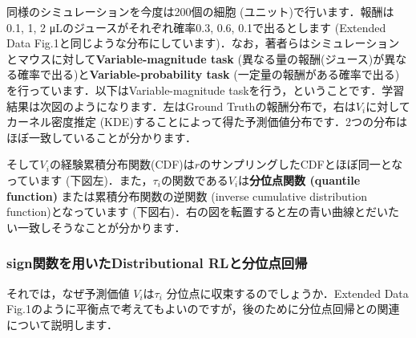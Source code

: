 同様のシミュレーションを今度は200個の細胞 (ユニット)で行います．報酬は0.1, 1, 2 μLのジュースがそれぞれ確率0.3, 0.6, 0.1で出るとします (Extended Data Fig.1と同じような分布にしています)．なお，著者らはシミュレーションとマウスに対して\textbf{Variable-magnitude task}
(異なる量の報酬(ジュース)が異なる確率で出る)と\textbf{Variable-probability task} (一定量の報酬がある確率で出る)を行っています．以下はVariable-magnitude taskを行う，ということです．学習結果は次図のようになります．左はGround Truthの報酬分布で，右は$V_i$に対してカーネル密度推定
(KDE)することによって得た予測価値分布です．2つの分布はほぼ一致していることが分かります．





そして$V_i$の経験累積分布関数(CDF)は$r$のサンプリングしたCDFとほぼ同一となっています (下図左)．また，$\tau_i$の関数である$V_i$は\textbf{分位点関数 (quantile function)} または累積分布関数の逆関数 (inverse cumulative distribution function)となっています
(下図右)．右の図を転置すると左の青い曲線とだいたい一致しそうなことが分かります．

\subsubsection{sign関数を用いたDistributional RLと分位点回帰}

それでは，なぜ予測価値 $V_i$は$\tau_i$ 分位点に収束するのでしょうか．Extended Data Fig.1のように平衡点で考えてもよいのですが，後のために分位点回帰との関連について説明します．

